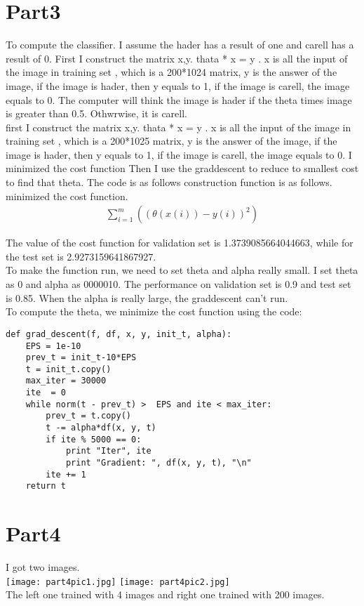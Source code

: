 \documentclass[12pt]{article}
\begin{document}
\section{Part3}
To compute the classifier. I assume the hader has a result of one and carell has a result of 0. First I construct the matrix x,y. thata * x = y . x is all the input of the image in training set , which is a 200*1024 matrix, y is the answer of the image, if the image is hader, then y equals to 1, if the image is carell, the image equals to 0. The computer will think the image is hader if the theta times image is greater than 0.5. Othwrwise, it is carell. \\
first I construct the matrix x,y. thata * x = y . x is all the input of the image in training set , which is a 200*1025 matrix, y is the answer of the image, if the image is hader, then y equals to 1, if the image is carell, the image equals to 0. I minimized the cost function Then I use the graddescent to reduce to smallest cost to find that theta. The code is as follows
construction function is as follows.
minimized the cost function. 
\begin{align*}
\sum_{i=1}^{m}((\theta (x(i))−y(i))^2)
\end{align*}

The value of the cost function for validation set is 1.3739085664044663, while for the test set is 2.9273159641867927.\\
\smallskip To make the function run, we need to set theta and alpha really small. I set theta as 0 and alpha as 0000010. The performance on validation set is 0.9 and test set is 0.85. When the alpha is really large, the graddescent can’t run.\\
To compute the theta, we minimize the cost function  using the code: \\
\begin{verbatim}
def grad_descent(f, df, x, y, init_t, alpha):
    EPS = 1e-10   
    prev_t = init_t-10*EPS
    t = init_t.copy()
    max_iter = 30000
    ite  = 0
    while norm(t - prev_t) >  EPS and ite < max_iter:
        prev_t = t.copy()
        t -= alpha*df(x, y, t)
        if ite % 5000 == 0:
            print "Iter", ite
            print "Gradient: ", df(x, y, t), "\n"
        ite += 1
    return t
\end{verbatim}
\pagebreak
\section{Part4}
I got two images.\\
\texttt{[image: part4pic1.jpg]}
\texttt{[image: part4pic2.jpg]}\\
The left one trained with 4 images and  right one trained with  200 images.
\end{document}
